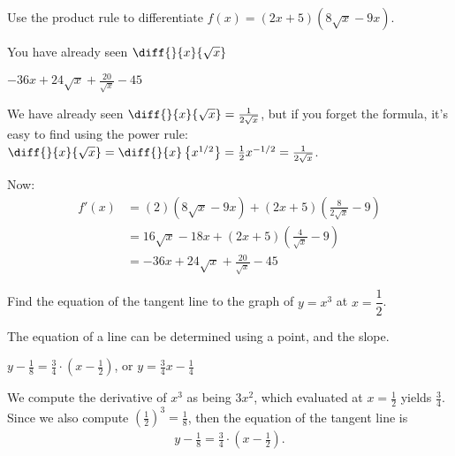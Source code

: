\begin{Mquestion}Use the product rule to differentiate $f(x)=(2x+5)(8\sqrt{x}-9x)$.
\end{Mquestion}
\begin{hint} You have already seen $\diff{}{x}\{\sqrt{x}\}$
\end{hint}
\begin{answer} $-36x+24\sqrt{x}+\frac{20}{\sqrt{x}}-45$
\end{answer}
\begin{solution} We have already seen $\diff{}{x}\{\sqrt{x}\}=\frac{1}{2\sqrt{x}}$, but if you forget the formula, it's easy to find using the power rule:
 $\diff{}{x}\{\sqrt{x}\}=\diff{}{x}\left\{x^{1/2}\right\}=\frac{1}{2}x^{-1/2}=\frac{1}{2\sqrt{x}}$.

 Now:
 \begin{align*}f'(x) &= (2)(8\sqrt{x}-9x)+(2x+5)\left(\frac{8}{2\sqrt{x}}-9\right)\\
 &= 16\sqrt{x}-18x+(2x+5)\left(\frac{4}{\sqrt{x}}-9\right)\\
 &=-36x+24\sqrt{x}+\frac{20}{\sqrt{x}}-45
 \end{align*}
\end{solution}




\begin{Mquestion}[2015Q]
Find the equation of the tangent line to the graph of $y=x^3$ at
$x=\dfrac{1}{2}$.
\end{Mquestion}
\begin{hint} The equation of a line can be determined using a point, and the slope.
\end{hint}
\begin{answer} $y -  \frac{1}{8} = \frac{3}{4}\cdot \left(x-\frac{1}{2}\right)$, or $y= \tfrac{3}{4} x - \tfrac{1}{4}$
\end{answer}
\begin{solution} We compute the derivative of $x^3$ as being $3x^2$, which evaluated at
$x=\frac{1}{2}$ yields $\frac{3}{4}$. Since we also compute
$\left( \frac{1}{2}\right)^3=\frac{1}{8}$, then the equation of the tangent line is
\begin{align*}
y -  \frac{1}{8} = \frac{3}{4}\cdot \left(x-\frac{1}{2}\right).
\end{align*}
\end{solution}


